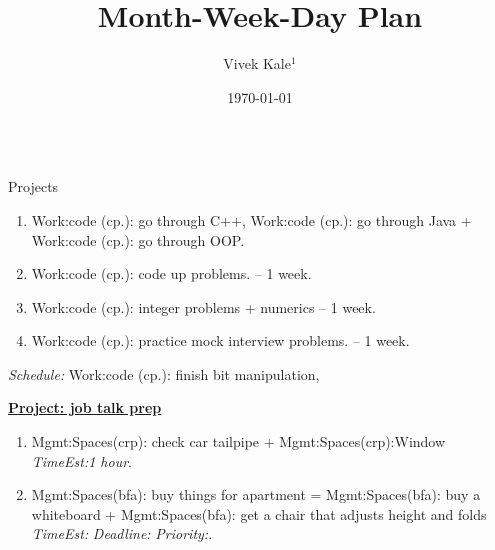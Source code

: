 \documentclass[serif, mathserif, final]{beamer}
\title{Month-Week-Day Plan}\author{Vivek Kale$^1$}\institute{$^1$ University of Illinois at Urbana-Champaign}\date{\today}
\newcommand{\te}[1]{\textit{TimeEst:}\textit{#1}}
\newcommand{\dl}[1]{\textit{Deadline:}\textit{#1}}
\newcommand{\pr}[1]{\textit{Priority:}\textit{#1}}
\begin{document}
\begin{frame}
\begin{columns}

\begin{column}{0.5\textwidth}
\begin{block}{Projects}
\begin{enumerate}
\tiny \item \tiny Work:code (cp.): go through C++, Work:code (cp.): go through Java + Work:code (cp.): go through OOP. 
\item \tiny Work:code (cp.): code up problems.  – 1 week.
\item \tiny Work:code (cp.): integer problems + numerics   -- 1 week. 
\item \tiny Work:code (cp.): practice mock interview problems. – 1 week. 
\end{enumerate}
{\it Schedule:} Work:code (cp.): finish bit manipulation,

{\underline{\bf Project: job talk prep}}
\begin{enumerate} 
\item \tiny Mgmt:Spaces(crp): check car tailpipe +
  Mgmt:Spaces(crp):Window \te{1 hour}.
\item \tiny Mgmt:Spaces(bfa): buy things for apartment =
  Mgmt:Spaces(bfa): buy a whiteboard + Mgmt:Spaces(bfa): get a chair
  that adjusts height and folds \te{} \dl{} \pr{}. 
\end{enumerate}


\end{block}
\end{column}
\end{columns}
\end{frame}
\end{document}
